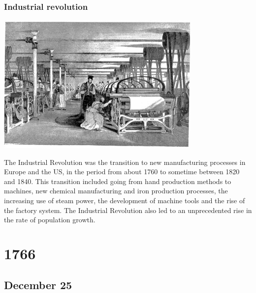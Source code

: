 \documentclass[11pt]{report}
\begin{document}
\subsection{Industrial revolution}
\vspace{2mm}\begin{center}\includegraphics[width=10cm]{./img/industrevolution.jpg}\end{center}
The Industrial Revolution was the transition to new manufacturing processes in Europe and the US, in the period from about 1760 to sometime between 1820 and 1840. This transition included going from hand production methods to machines, new chemical manufacturing and iron production processes, the increasing use of steam power, the development of machine tools and the rise of the factory system. The Industrial Revolution also led to an unprecedented rise in the rate of population growth.

\chapter{1766}
\section{December 25}
\end{document}
